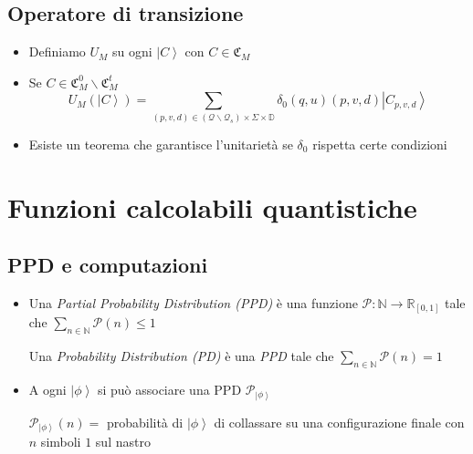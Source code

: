 \documentclass{beamer}
\begin{document}
\subsection{Operatore di transizione}

\begin{frame}{\subsecname}{}
	\begin{itemize}
		\item Definiamo \( U_{M} \) su ogni \(\left | C \right \rangle \) con \( C \in \mathfrak{C}_M \)
		\item Se \( C \in \mathfrak{C}^{0}_M \backslash \mathfrak{C}^{t}_M \)
		\[ U_{M} \left ( \left | C \right \rangle \right ) =
		\sum_{\left (p,v,d \right ) \in \left ( \mathcal{Q} \backslash \mathcal{Q}_{s} \right ) \times \Sigma \times \mathbb{D}}
		\delta_{0}(q, u)(p, v, d) \left | C_{p,v,d} \right \rangle \]
		\item Esiste un teorema che garantisce l'unitarietà se \(\delta_{0}\) rispetta certe condizioni
	\end{itemize}
\end{frame}

\section{Funzioni calcolabili quantistiche}

\subsection{PPD e computazioni}

\begin{frame}{\secname}{\subsecname}
	\begin{itemize}
		\item Una \textit{Partial Probability Distribution (PPD)} è una funzione \( \mathcal{P} : \mathbb{N} \rightarrow \mathbb{R}_{[0,1]} \) tale che \( \sum_{n \in \mathbb{N}} \mathcal{P} \left ( n \right ) \le 1 \)\par
		Una \textit{Probability Distribution (PD)} è una \textit{PPD} tale che \( \sum_{n \in \mathbb{N}} \mathcal{P} \left ( n \right ) = 1 \)
		\item A ogni \( \left | \phi \right \rangle \) si può associare una PPD \( \mathcal{P}_{\left | \phi \right \rangle} \)\par
		\( \mathcal{P}_{\left | \phi \right \rangle} \left ( n \right ) = \) probabilità di \( \left | \phi \right \rangle \) di collassare su una configurazione finale con \(n\) simboli \(1\) sul nastro 
	\end{itemize}
\end{frame}
\end{document}
